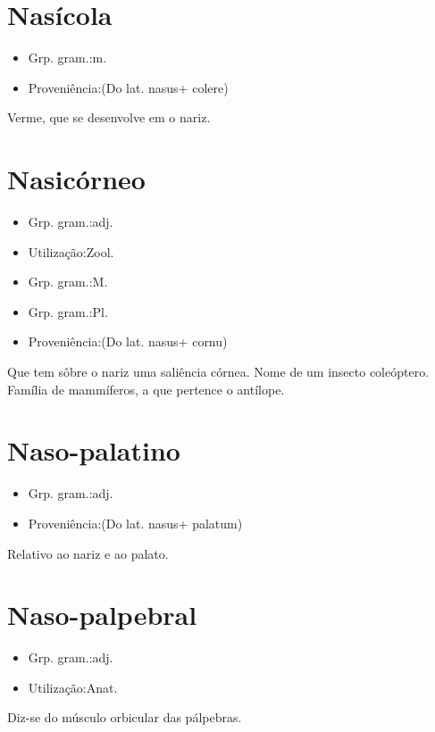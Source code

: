 \section{Nasícola}
\begin{itemize}
\item {Grp. gram.:m.}
\end{itemize}
\begin{itemize}
\item {Proveniência:(Do lat. \textunderscore nasus\textunderscore  + \textunderscore colere\textunderscore )}
\end{itemize}
Verme, que se desenvolve em o nariz.
\section{Nasicórneo}
\begin{itemize}
\item {Grp. gram.:adj.}
\end{itemize}
\begin{itemize}
\item {Utilização:Zool.}
\end{itemize}
\begin{itemize}
\item {Grp. gram.:M.}
\end{itemize}
\begin{itemize}
\item {Grp. gram.:Pl.}
\end{itemize}
\begin{itemize}
\item {Proveniência:(Do lat. \textunderscore nasus\textunderscore  + \textunderscore cornu\textunderscore )}
\end{itemize}
Que tem sôbre o nariz uma saliência córnea.
Nome de um insecto coleóptero.
Família de mammíferos, a que pertence o antílope.
\section{Naso-palatino}
\begin{itemize}
\item {Grp. gram.:adj.}
\end{itemize}
\begin{itemize}
\item {Proveniência:(Do lat. \textunderscore nasus\textunderscore  + \textunderscore palatum\textunderscore )}
\end{itemize}
Relativo ao nariz e ao palato.
\section{Naso-palpebral}
\begin{itemize}
\item {Grp. gram.:adj.}
\end{itemize}
\begin{itemize}
\item {Utilização:Anat.}
\end{itemize}
Diz-se do músculo orbicular das pálpebras.

